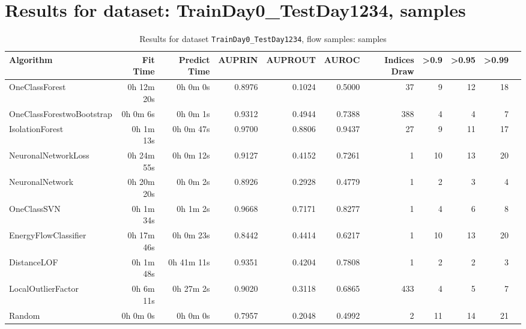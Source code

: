 \documentclass{article}
\begin{document}
\section*{Results for dataset: TrainDay0_TestDay1234, samples}
\begin{table}[h!]
\centering
\caption{Results for dataset \texttt{TrainDay0_TestDay1234}, flow samples: samples}
\label{tab:trainday0testday1234_samples}
\begin{tabular}{lrrrrrrrrrr}
\toprule
Algorithm & Fit Time & Predict Time & AUPRIN & AUPROUT & AUROC & Indices Draw & >0.9 & >0.95 & >0.99 \\
\midrule
OneClassForest & 0h 12m 20s & 0h 0m 0s & 0.8976 & 0.1024 & 0.5000 & 37 & 9 & 12 & 18 \\
OneClassForestwoBootstrap & 0h 0m 6s & 0h 0m 1s & 0.9312 & 0.4944 & 0.7388 & 388 & 4 & 4 & 7 \\
IsolationForest & 0h 1m 13s & 0h 0m 47s & 0.9700 & 0.8806 & 0.9437 & 27 & 9 & 11 & 17 \\
NeuronalNetworkLoss & 0h 24m 55s & 0h 0m 12s & 0.9127 & 0.4152 & 0.7261 & 1 & 10 & 13 & 20 \\
NeuronalNetwork & 0h 20m 20s & 0h 0m 2s & 0.8926 & 0.2928 & 0.4779 & 1 & 2 & 3 & 4 \\
OneClassSVN & 0h 1m 34s & 0h 1m 2s & 0.9668 & 0.7171 & 0.8277 & 1 & 4 & 6 & 8 \\
EnergyFlowClassifier & 0h 17m 46s & 0h 0m 23s & 0.8442 & 0.4414 & 0.6217 & 1 & 10 & 13 & 20 \\
DistanceLOF & 0h 1m 48s & 0h 41m 11s & 0.9351 & 0.4204 & 0.7808 & 1 & 2 & 2 & 3 \\
LocalOutlierFactor & 0h 6m 11s & 0h 27m 2s & 0.9020 & 0.3118 & 0.6865 & 433 & 4 & 5 & 7 \\
Random & 0h 0m 0s & 0h 0m 0s & 0.7957 & 0.2048 & 0.4992 & 2 & 11 & 14 & 21 \\
\bottomrule
\end{tabular}
\end{table}
\end{document}
